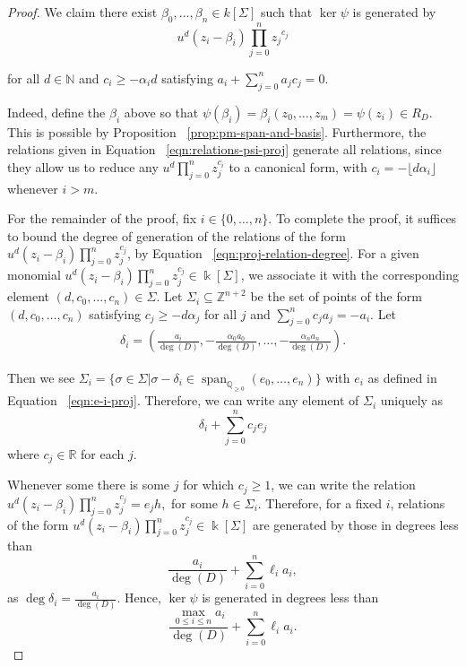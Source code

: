 \documentclass{amsart}
\theoremstyle{plain}
\theoremstyle{definition}
\theoremstyle{remark}
\numberwithin{equation}{section}
\newcommand\bq{{\mathbb Q}}
\newcommand\bz{{\mathbb Z}}
\newcommand\bk{{\Bbbk}}
\newcommand\bida{a}
\DeclareMathOperator{\newspan}{span}
\begin{document}
\begin{proof}
We claim there exist $\beta_0, \ldots, \beta_n \in k[\Sigma]$
such that $\ker \psi$ is generated by
\begin{equation}
\label{eqn:relations-psi-proj}
	u^d(z_i - \beta_i)\prod_{j=0}^n {z_j}^{c_{j}}
\end{equation}

\noindent
for all $d \in \mathbb{N}$ and $c_i \ge -\alpha_i d$ satisfying
$\bida_i + \sum_{j = 0}^n \bida_j c_j = 0$.

Indeed, define the $\beta_i$ above so that $\psi(\beta_i) = \beta_i(z_0, \ldots, z_m)= \psi(z_i) \in R_D.$ This is possible by Proposition ~\ref{prop:pm-span-and-basis}.
Furthermore, the relations given in Equation
~\eqref{eqn:relations-psi-proj} generate all relations, since they
allow us to reduce any $u^d \prod_{j = 0}^n z_j^{c_i}$ to a canonical
form, with $c_i = -\lfloor  d \alpha_i\rfloor$ whenever $i  > m$.

For the remainder of the proof, fix $i \in \{0,\ldots, n\}$. To
complete the proof, it suffices to bound the degree of generation
of the relations of the form $u^d(z_i - \beta_i) \prod_{j = 0}^n
z_j^{c_j}$, by Equation ~\eqref{eqn:proj-relation-degree}. For
a given monomial
$u^d(z_i - \beta_i)\prod_{j=0}^n z_j^{c_j} \in \bk[\Sigma]$, we associate it with the corresponding element $(d, c_0,\ldots, c_n) \in\Sigma$. Let $\Sigma_i \subseteq \bz^{n + 2}$
be the set of points of the form $(d, c_0, \ldots, c_n)$ satisfying
$c_j \ge -d \alpha_j$ for all $j$ and $\sum_{j=0}^n c_j a_j = -a_i$.
Let
\begin{align*}
	\delta_i = \left(\frac{a_i}{\deg(D)}, -\frac{\alpha_0 a_0}{\deg(D)},
	\ldots, - \frac{\alpha_n a_n}{\deg(D)} \right).
\end{align*}

\noindent
Then we see $\Sigma_i = \{\sigma \in \Sigma | \sigma - \delta_i \in \newspan_{\bq_{\geq 0}}
(e_0, \ldots, e_n)\}$ with $e_i$ as defined in Equation
~\ref{eqn:e-i-proj}. Therefore, we can write any element of
$\Sigma_i$ uniquely as
\[
	\delta_i + \sum_{j=0}^n c_j e_j
\]
where $c_j \in \mathbb{R}$ for each $j$.

Whenever some there is some $j$ for which $c_j \ge 1$, we can write the relation $u^d(z_i -
\beta_i)\prod_{j=0}^n z_j^{c_j} = e_j h,$ for some
$h \in \Sigma_i$. Therefore, for a fixed $i$, relations of the form
$u^d(z_i - \beta_i)\prod_{j=0}^n z_j^{c_j} \in \bk[\Sigma]$ are
generated by those in degrees less than
\[
	\frac{\bida_i}{\deg(D)} + \sum_{i=0}^n \ell_i a_i,
\]
as $\deg \delta_i = \frac{a_i}{\deg(D)}$. Hence,
$\ker \psi$ is generated in degrees less than
\[
	\frac{\max_{0 \leq i \leq n} \bida_i}{\deg(D)} + \sum_{i=0}^n \ell_i a_i.
\]
\end{proof}
\end{document}
